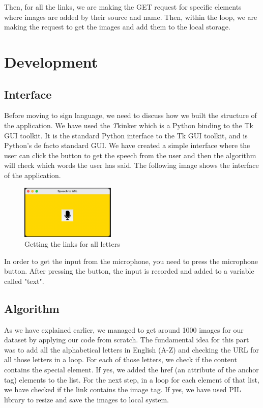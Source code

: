 \documentclass[twocolumn,10pt]{asme2ej}
\begin{document}
Then, for all the links, we are making the GET request for specific elements where images are added by their source and name. Then, within the loop, we are making the request to get the images and add them to the local storage. 

\section{Development}

\subsection{Interface}

Before moving to sign language, we need to discuss how we built the structure of the application. We have used the {\emph Tkinker} which is a Python binding to the Tk GUI toolkit. It is the standard Python interface to the Tk GUI toolkit, and is Python's de facto standard GUI. We have created a simple interface where the user can click the button to get the speech from the user and then the algorithm will check which words the user has said. The following image shows the interface of the application.

\begin{figure}[h]
    \centering
    \includegraphics[width=0.4\textwidth]{figure/fig2.png}
    \caption{Getting the links for all letters}
    \label{fig:mesh1}
\end{figure}

In order to get the input from the microphone, you need to press the microphone button. After pressing the button, the input is recorded and added to a variable called "text". 

\subsection{Algorithm}

As we have explained earlier, we managed to get around 1000 images for our dataset by applying our code from scratch. The fundamental idea for this part was to add all the alphabetical letters in English (A-Z) and checking the URL for all those letters in a loop. For each of those letters, we check if the content contains the special element. If yes, we added the href (an attribute of the anchor tag) elements to the list. For the next step, in a loop for each element of that list, we have checked if the link contains the image tag. If yes, we have used PIL library to resize and save the images to local system. 
\end{document}

